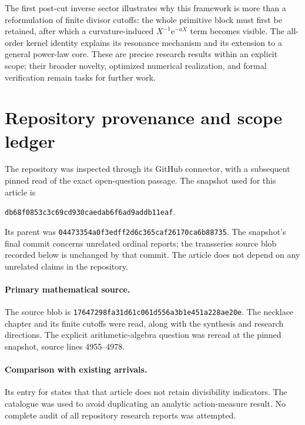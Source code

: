 \documentclass[11pt,a4paper]{article}
\numberwithin{equation}{section}
\theoremstyle{definition}
\theoremstyle{remark}
\newcommand{\ee}{\mathrm e}
\newcommand{\snapshot}{\texttt{db68f0853c3c69cd930caedab6f6ad9addb11eaf}}
\begin{document}
The first post-cut inverse sector illustrates why this framework is
more than a reformulation of finite divisor cutoffs: the whole
primitive block must first be retained, after which a curvature-induced
$X^{-1}\ee^{-aX}$ term becomes visible. The all-order kernel identity
explains its resonance mechanism and its extension to a general
power-law core. These are precise research results within an explicit
scope; their broader novelty, optimized numerical realization, and
formal verification remain tasks for further work.

\appendix
\section{Repository provenance and scope ledger}\label{app:provenance}

The repository was inspected through its GitHub connector, with a
subsequent pinned read of the exact open-question passage. The snapshot
used for this article is
\begin{center}
\small\snapshot.
\end{center}
Its parent was
\texttt{04473354a0f3edff2d6c365caf26170ca6b88735}.
The snapshot's final commit concerns unrelated ordinal reports; the
transseries source blob recorded below is unchanged by that commit.
The article does not depend on any unrelated claims in the repository.

\paragraph{Primary mathematical source.}
{\small{}}\par
The source blob is
\texttt{17647298fa31d61c061d556a3b1e451a228ae20e}.
The necklace chapter and its finite cutoffs were read, along with the
synthesis and research directions. The explicit arithmetic-algebra
question was reread at the pinned snapshot, source lines 4955--4978.

\paragraph{Comparison with existing arrivals.}
{\small{}}\par
Its entry for
 states that that
article does not retain divisibility indicators. The catalogue was used
to avoid duplicating an analytic action-measure result. No complete
audit of all repository research reports was attempted.
\end{document}
